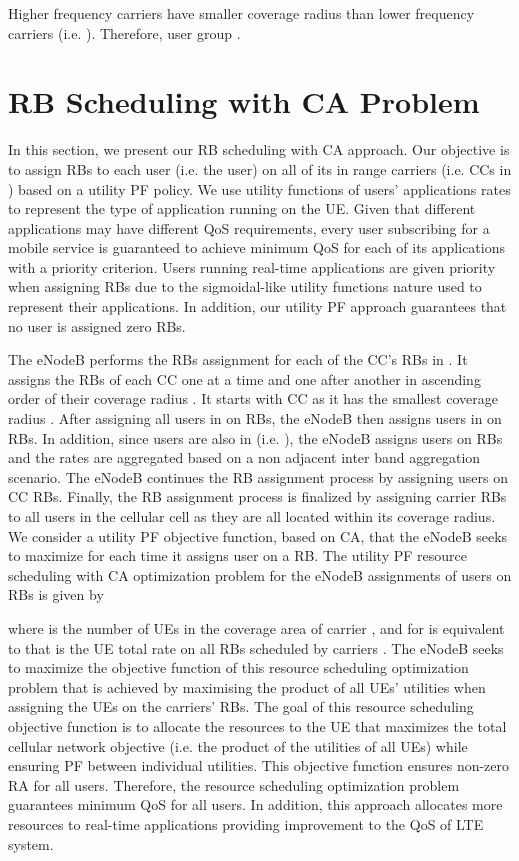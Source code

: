 \documentclass[conference]{IEEEtran}
\begin{document}
Higher frequency carriers have smaller coverage radius  than lower frequency carriers (i.e. ). Therefore, user group . \section{RB Scheduling with CA Problem}\label{sec:RBscheduling}
In this section, we present our RB scheduling with CA approach. Our objective is to assign RBs to each user (i.e. the  user) on all of its in range carriers (i.e. CCs in ) based on a utility PF policy. We use utility functions of users' applications rates to represent the type of application running on the UE. Given that different applications may have different QoS requirements, every user subscribing for a mobile service is guaranteed to achieve minimum QoS for each of its applications with a priority criterion. Users running real-time applications are given priority when assigning RBs due to the sigmoidal-like utility functions nature used to represent their applications. In addition, our utility PF approach guarantees that no user is assigned zero RBs.

The eNodeB performs the RBs assignment for each of the CC's RBs in . It assigns the RBs of each CC  one at a time and one after another in ascending order of their coverage radius . It starts with CC  as it has the smallest coverage radius . After assigning all users in  on  RBs, the eNodeB then assigns users in  on  RBs. In addition, since  users are also in  (i.e. ), the eNodeB assigns  users on  RBs and the rates are aggregated based on a non adjacent inter band aggregation scenario. The eNodeB continues the RB assignment process by assigning  users on CC  RBs. Finally, the RB assignment process is finalized by assigning carrier  RBs to all users in the cellular cell as they are all located within its coverage radius. We consider a utility PF objective function, based on CA, that the eNodeB seeks to maximize for each time it assigns user on a RB. The utility PF resource scheduling with CA optimization problem for the eNodeB assignments of  users on  RBs is given by

where  is the number of UEs in the coverage area of carrier ,
 and  for  is equivalent to  that is the  UE total rate on all RBs scheduled by carriers . The eNodeB seeks to maximize the objective function of this resource scheduling optimization problem that is achieved by maximising the product of all UEs' utilities when assigning the UEs on the carriers' RBs. The goal of this resource scheduling objective function is to allocate the resources to the UE that maximizes the total cellular network objective (i.e. the product of the utilities of all UEs) while ensuring PF between individual utilities. This objective function ensures non-zero RA for all users. Therefore, the resource scheduling optimization problem guarantees minimum QoS for all users. In addition, this approach allocates more resources to real-time applications providing improvement to the QoS of LTE system.
\end{document}
